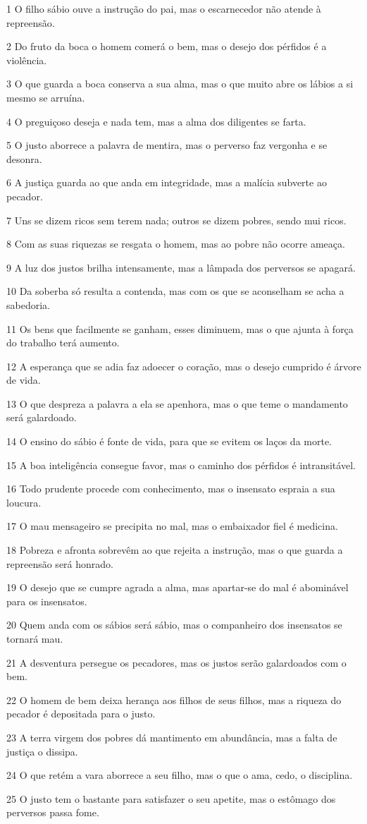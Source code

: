 \par 1 O filho sábio ouve a instrução do pai, mas o escarnecedor não atende à repreensão.
\par 2 Do fruto da boca o homem comerá o bem, mas o desejo dos pérfidos é a violência.
\par 3 O que guarda a boca conserva a sua alma, mas o que muito abre os lábios a si mesmo se arruína.
\par 4 O preguiçoso deseja e nada tem, mas a alma dos diligentes se farta.
\par 5 O justo aborrece a palavra de mentira, mas o perverso faz vergonha e se desonra.
\par 6 A justiça guarda ao que anda em integridade, mas a malícia subverte ao pecador.
\par 7 Uns se dizem ricos sem terem nada; outros se dizem pobres, sendo mui ricos.
\par 8 Com as suas riquezas se resgata o homem, mas ao pobre não ocorre ameaça.
\par 9 A luz dos justos brilha intensamente, mas a lâmpada dos perversos se apagará.
\par 10 Da soberba só resulta a contenda, mas com os que se aconselham se acha a sabedoria.
\par 11 Os bens que facilmente se ganham, esses diminuem, mas o que ajunta à força do trabalho terá aumento.
\par 12 A esperança que se adia faz adoecer o coração, mas o desejo cumprido é árvore de vida.
\par 13 O que despreza a palavra a ela se apenhora, mas o que teme o mandamento será galardoado.
\par 14 O ensino do sábio é fonte de vida, para que se evitem os laços da morte.
\par 15 A boa inteligência consegue favor, mas o caminho dos pérfidos é intransitável.
\par 16 Todo prudente procede com conhecimento, mas o insensato espraia a sua loucura.
\par 17 O mau mensageiro se precipita no mal, mas o embaixador fiel é medicina.
\par 18 Pobreza e afronta sobrevêm ao que rejeita a instrução, mas o que guarda a repreensão será honrado.
\par 19 O desejo que se cumpre agrada a alma, mas apartar-se do mal é abominável para os insensatos.
\par 20 Quem anda com os sábios será sábio, mas o companheiro dos insensatos se tornará mau.
\par 21 A desventura persegue os pecadores, mas os justos serão galardoados com o bem.
\par 22 O homem de bem deixa herança aos filhos de seus filhos, mas a riqueza do pecador é depositada para o justo.
\par 23 A terra virgem dos pobres dá mantimento em abundância, mas a falta de justiça o dissipa.
\par 24 O que retém a vara aborrece a seu filho, mas o que o ama, cedo, o disciplina.
\par 25 O justo tem o bastante para satisfazer o seu apetite, mas o estômago dos perversos passa fome.

